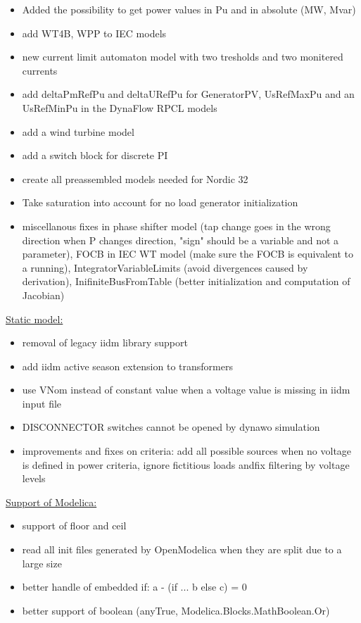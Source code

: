 \documentclass[a4paper, 12pt]{report}
\begin{document}
\begin{itemize}
\item Added the possibility to get power values in Pu and in absolute (MW, Mvar)
\item add WT4B, WPP to IEC models
\item new current limit automaton model with two tresholds and two monitered currents
\item add deltaPmRefPu and deltaURefPu for GeneratorPV, UsRefMaxPu and an UsRefMinPu in the DynaFlow RPCL models
\item add a wind turbine model
\item add a switch block for discrete PI
\item create all preassembled models needed for Nordic 32
\item Take saturation into account for no load generator initialization
\item miscellanous fixes in phase shifter model (tap change goes in the wrong direction when P changes direction, "sign" should be a variable and not a parameter), FOCB in IEC WT model (make sure the FOCB is equivalent to a running), IntegratorVariableLimits (avoid divergences caused by derivation), InifiniteBusFromTable (better initialization and computation of Jacobian)
\end{itemize}

\underline{Static model:}

\begin{itemize}
\item removal of legacy iidm library support
\item add iidm active season extension to transformers
\item use VNom instead of constant value when a voltage value is missing in iidm input file
\item DISCONNECTOR switches cannot be opened by dynawo simulation
\item improvements and fixes on criteria: add all possible sources when no voltage is defined in power criteria, ignore fictitious loads andfix filtering by voltage levels
\end{itemize}

\underline{Support of Modelica:}

\begin{itemize}
\item support of floor and ceil
\item read all init files generated by OpenModelica when they are split due to a large size
\item better handle of embedded if: a - (if ... b else c) = 0
\item better support of boolean (anyTrue, Modelica.Blocks.MathBoolean.Or)
\end{itemize}
\end{document}
